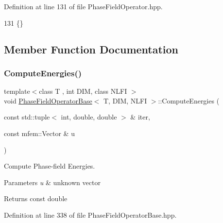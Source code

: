 Definition at line 131 of file Phase\+Field\+Operator.\+hpp.


\begin{DoxyCode}
131 \{\}
\end{DoxyCode}


\subsection{Member Function Documentation}
\mbox{\label{classPhaseFieldOperatorBase_ac313363a74691d6b500191ff475b57fb}} 
\subsubsection{\texorpdfstring{Compute\+Energies()}{ComputeEnergies()}}
{\footnotesize\ttfamily template$<$class T , int D\+IM, class N\+L\+FI $>$ \\
void \hyperlink{classPhaseFieldOperatorBase}{Phase\+Field\+Operator\+Base}$<$ T, D\+IM, N\+L\+FI $>$\+::Compute\+Energies (\begin{DoxyParamCaption}\item[{const std\+::tuple$<$ int, double, double $>$ \&}]{iter,  }\item[{const mfem\+::\+Vector \&}]{u }\end{DoxyParamCaption})\hspace{0.3cm}{\ttfamily [inherited]}}



Compute Phase-\/field Energies. 


\begin{DoxyParams}{Parameters}
{\em u} & unknown vector \\
\hline
\end{DoxyParams}
\begin{DoxyReturn}{Returns}
const double 
\end{DoxyReturn}


Definition at line 338 of file Phase\+Field\+Operator\+Base.\+hpp.


